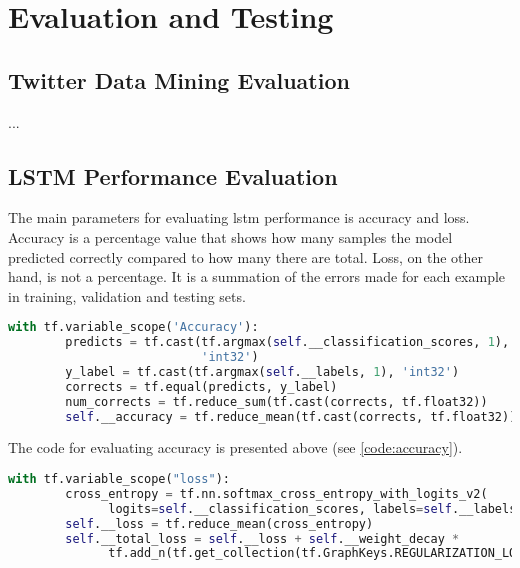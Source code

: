 \section{Evaluation and Testing}
    
    
    
    \subsection{Twitter Data Mining Evaluation}
        
        ...
        
    \subsection{LSTM Performance Evaluation}
        
        The main parameters for evaluating \gls{lstm} performance is accuracy and loss. Accuracy is a percentage value that shows how many samples the model predicted correctly compared to how many there are total. Loss, on the other hand, is not a percentage. It is a summation of the errors made for each example in training, validation and testing sets.
        
        \begin{lstlisting}[language=Python, caption=Accuracy Calculation, label=code:accuracy]
    with tf.variable_scope('Accuracy'):
        predicts = tf.cast(tf.argmax(self.__classification_scores, 1), 
                           'int32')
        y_label = tf.cast(tf.argmax(self.__labels, 1), 'int32')
        corrects = tf.equal(predicts, y_label)
        num_corrects = tf.reduce_sum(tf.cast(corrects, tf.float32))
        self.__accuracy = tf.reduce_mean(tf.cast(corrects, tf.float32))
        \end{lstlisting}
        
        The code for evaluating accuracy is presented above (see \cref{code:accuracy}).
        
        \begin{lstlisting}[language=Python, caption=Loss Calculation, label=code:loss]
    with tf.variable_scope("loss"):
        cross_entropy = tf.nn.softmax_cross_entropy_with_logits_v2(
              logits=self.__classification_scores, labels=self.__labels)
        self.__loss = tf.reduce_mean(cross_entropy)
        self.__total_loss = self.__loss + self.__weight_decay * 
              tf.add_n(tf.get_collection(tf.GraphKeys.REGULARIZATION_LOSSES))
        \end{lstlisting}
        
